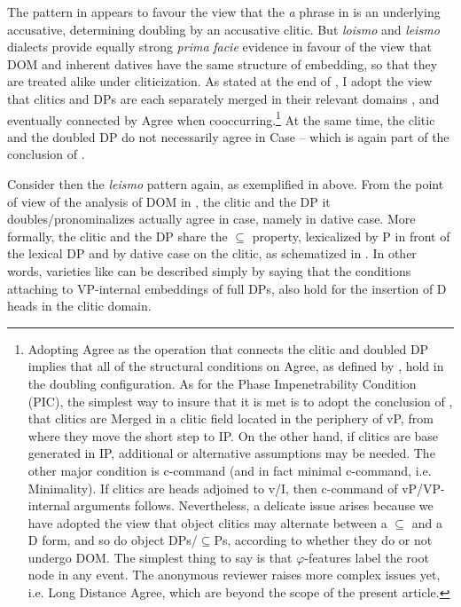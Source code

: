 \documentclass[output=paper,colorlinks,citecolor=brown,nonflat]{./langscibook}
\begin{document}
The pattern in  appears to favour the view that the \textit{a} phrase in  is an underlying accusative, determining doubling by an accusative clitic. But \textit{loismo} and \textit{leismo} dialects provide equally strong \textit{prima} \textit{facie} evidence in favour of the view that DOM and inherent datives have the same structure of embedding, so that they are treated alike under cliticization. As stated at the end of , I adopt the view that clitics and DPs are each separately merged in their relevant domains \citep{Sportiche1996}, and eventually connected by  Agree when cooccurring.\footnote{Adopting Agree as the operation that connects the clitic and doubled DP implies that all of the structural conditions on Agree, as defined by \citet{Chomsky2000}, hold in the doubling configuration. As for the Phase Impenetrability Condition (PIC), the simplest way to insure that it is met is to adopt the conclusion of \citet{Sportiche1996}, that clitics are Merged in a clitic field located in the periphery of vP, from where they move the short step to IP. On the other hand, if clitics are base generated in IP, additional or alternative assumptions may be needed. The other major condition is c-command (and in fact minimal c-command, i.e. Minimality). If clitics are heads adjoined to v/I, then c-command of vP/VP-internal arguments follows. Nevertheless, a delicate issue arises because we have adopted the view that object clitics may alternate between a \textrm{${\subseteq}$} and a D form, and so do object DPs/\textrm{${\subseteq}$}Ps, according to whether they do or not undergo DOM.  The simplest thing to say is that $\varphi $-features label the root node in any event. The anonymous reviewer raises more complex issues yet, i.e. Long Distance Agree, which are beyond the scope of the present article.}{} At the same time, the clitic and the doubled DP do not necessarily agree in Case – which is again part of the conclusion of . 

Consider then the \textit{leismo} pattern again, as exemplified in  above. From the point of view of the analysis of DOM in , the clitic and the DP it doubles/pronominalizes actually agree in case, namely in dative case. More formally, the clitic and the DP share the ${\subseteq}$ property, lexicalized by P in front of the lexical DP and by dative case on the clitic, as schematized in . In other words, varieties like  can be described simply by saying that the conditions attaching to VP-internal embeddings of full DPs, also hold for the insertion of D heads in the clitic domain.  
\end{document}
